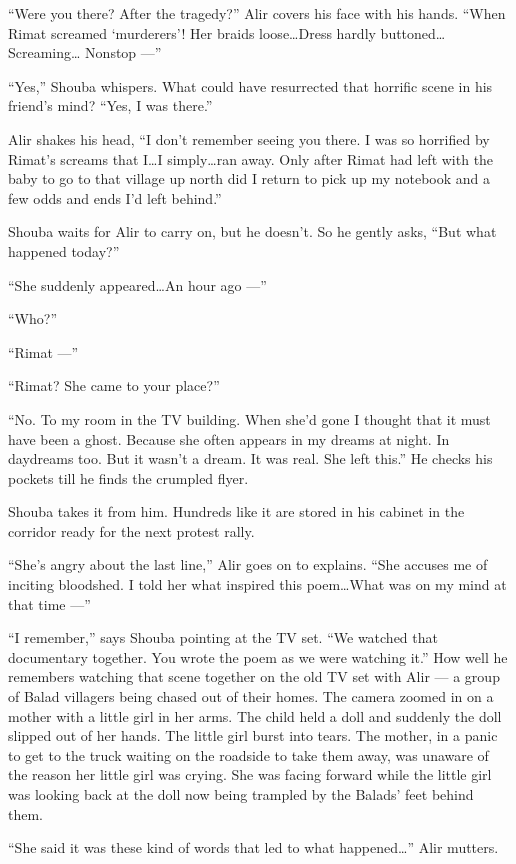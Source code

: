 \documentclass[twoside,11pt,openany]{book}
\begin{document}
``Were you there? After the tragedy?'' Alir covers his face with his hands.
``When Rimat screamed `murderers'! Her braids loose{\ldots}Dress hardly buttoned{\ldots}Screaming{\ldots}
Nonstop ---''

``Yes,'' Shouba whispers. What could have resurrected that horrific scene in his friend's
mind?  {}``Yes, I was there.''

Alir shakes his head, ``I don't remember seeing you there.{ }I was so horrified by Rimat's
screams that I{\ldots}I simply{\ldots}ran away. Only after Rimat had left with the baby to go to that village up north
did I return to pick up my notebook and a few odds and ends I'd left behind.''

Shouba waits for Alir to carry on, but he doesn't. So he gently asks, ``But what happened
today?''

``She suddenly appeared{\ldots}An hour ago ---''

``Who?''

``Rimat ---''

``Rimat? She came to your place?''

``No. To my room in the TV building. When she'd gone I thought that it must have been a ghost. Because she
often appears in my dreams at night. In daydreams too. But it wasn't a dream. It was real. She left
this.'' He checks his pockets till he finds the crumpled flyer.

Shouba takes it from him. Hundreds like it are stored in his cabinet in the corridor ready for the next protest rally.

``She's angry about the last line,'' Alir goes on to explains. ``She accuses me
of inciting bloodshed. I told her what inspired this poem{\ldots}What was on my mind at that time ---''

``I remember,'' says Shouba pointing at the TV set. ``We watched that documentary
together. You wrote the poem as we were watching it.'' How well he remembers watching that scene together
on the old TV set with Alir ---  a group of Balad villagers being chased out of their homes. The camera
zoomed in on a mother with a little girl in her arms. The child held a doll and suddenly the doll slipped out of her
hands. The little girl burst into tears. The mother, in a panic to get to the truck waiting on the roadside to take
them away, was unaware of the reason her little girl was crying. She was facing forward while the little girl was
looking back at the doll now being trampled by the Balads{'} feet behind them.

``She said it was these kind of words that led to what happened{\ldots}'' Alir mutters.
\end{document}
